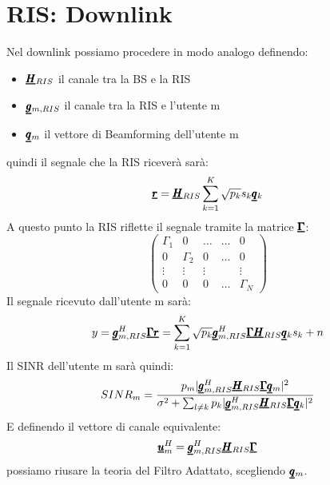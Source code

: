 \section{RIS: Downlink}
Nel downlink possiamo procedere in modo analogo definendo:
\begin{itemize}
    \item $\pmb{\underline{H}}_{RIS}$ il canale tra la BS e la RIS
    \item $\pmb{\underline{g}}_{m,RIS}$ il canale tra la RIS e l'utente m
    \item $\pmb{\underline{q}}_m$ il vettore di Beamforming dell'utente m
\end{itemize}
quindi il segnale che la RIS riceverà sarà:
\begin{equation*}
    \pmb{\underline{r}} = \pmb{\underline{H}}_{RIS} \sum_{k=1}^K \sqrt{p_k} s_k \pmb{\underline{q}}_k
\end{equation*}
A questo punto la RIS riflette il segnale tramite la matrice $\pmb{\underline{\Gamma}}$:
\begin{equation*}
    \begin{pmatrix}
    \Gamma_1 & 0 & \dots & \dots & 0 \\
    0 & \Gamma_2 & 0 & \dots & 0 \\
    \vdots & \vdots & \vdots & & \vdots \\
    0 & 0 & 0 & \dots & \Gamma_N
    \end{pmatrix}
\end{equation*}
Il segnale ricevuto dall'utente m sarà:
\begin{equation*}
    y = \pmb{\underline{g}}_{m,RIS}^H \pmb{\underline{\Gamma}} \pmb{\underline{r}} = \sum_{k=1}^K \sqrt{p_k} \pmb{\underline{g}}_{m,RIS}^H \pmb{\underline{\Gamma}} \pmb{\underline{H}}_{RIS}\pmb{\underline{q}}_k s_k + n
\end{equation*} 
Il SINR dell'utente m sarà quindi:
\begin{equation*}
    SINR_m = \frac{p_m |\pmb{\underline{g}}_{m,RIS}^H  \pmb{\underline{H}}_{RIS} \pmb{\underline{\Gamma}} \pmb{\underline{q}}_{m}|^2}{\sigma^2 + \sum_{l \neq k} p_k |\pmb{\underline{g}}_{m,RIS}^H \pmb{\underline{H}}_{RIS} \pmb{\underline{\Gamma}} \pmb{\underline{q}}_{k}|^2}
\end{equation*}
E definendo il vettore di canale equivalente:
\begin{equation*}
    \pmb{\underline{u}}_m^H = \pmb{\underline{g}}_{m,RIS}^H \pmb{\underline{H}}_{RIS} \pmb{\underline{\Gamma}} 
\end{equation*}
possiamo riusare la teoria del Filtro Adattato, scegliendo $\pmb{\underline{q}}_m$.


